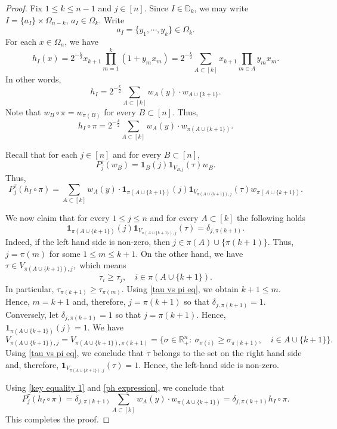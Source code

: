 \documentclass{amsart}
\numberwithin{equation}{section}
\theoremstyle{definition}
\theoremstyle{remark}
\newcommand{\1}{\mathbf 1}
\begin{document}
\begin{proof} 
	Fix  $1\leq k \leq n-1$ and $j\in [n]$. 
	Since $I\in\mathbb{D}_k$, we may write $I=\{a_I\}\times \Omega_{n-k}$, $a_I\in \Omega_k$.	
Write
$$a_I=\{y_1,\cdots,y_k\}\in\Omega_k.$$
For each $x\in \Omega_n$, we have
$$h_I(x)=2^{-\frac{k}{2}}x_{k+1}\prod_{m=1}^k(1+y_mx_m)=2^{-\frac{k}{2}}\sum_{A\subset[k]}x_{k+1}\prod_{m\in A}y_mx_m.$$
In other words,
$$h_I=2^{-\frac{k}{2}}\sum_{A\subset [k]}w_A(y)\cdot w_{A\cup\{k+1\}}.$$
Note that $w_B\circ\pi=w_{\pi(B)}$ for every $B\subset [n].$ Thus,
$$h_I\circ\pi=2^{-\frac{k}{2}}\sum_{A\subset[k]}w_A(y)\cdot w_{\pi(A\cup\{k+1\})}.$$

\noindent Recall that for each $j\in [n]$ and for every $B\subset  [n]$,
$$
P^{\tau}_j(w_B)=\1_B(j)\1_{V_{B,j}}(\tau)w_B.
$$
Thus,
\begin{equation}\label{ph expression}
P_j^{\tau}(h_I\circ\pi)=\sum_{A\subset[k]}w_A(y)\cdot \1_{\pi(A\cup\{k+1\})}(j) \1_{V_{\pi(A\cup\{k+1\}),j}}(\tau) w_{\pi(A\cup\{k+1\})}.
\end{equation}

We now claim that for every $1\leq j\leq n$ and for every $A\subset [k]$ the following holds
\begin{equation}\label{key equality 1}
\1_{\pi(A\cup\{k+1\})}(j) \1_{V_{\pi(A\cup\{k+1\}),j}}(\tau)=\delta_{j,\pi(k+1)}.
\end{equation}
Indeed, if the left hand side is non-zero, then $j\in\pi(A)\cup\{\pi(k+1)\}.$ Thus, $j=\pi(m)$ for some $1\leq m\leq k+1.$ On the other hand, we have $\tau\in V_{\pi(A\cup\{k+1\}),j},$ which means
$$\tau_i\geq \tau_j,\quad i\in \pi(A\cup\{k+1\}).$$
In particular, $\tau_{\pi(k+1)}\geq\tau_{\pi(m)}.$ Using \eqref{tau vs pi eq}, we obtain $k+1\leq m.$ Hence, $m=k+1$ and, therefore, $j=\pi(k+1)$ so that $\delta_{j,\pi(k+1)}=1.$ 
Conversely, let $\delta_{j,\pi(k+1)}=1$ so that $j=\pi(k+1).$ Hence, $\1_{\pi(A\cup\{k+1\})}(j)=1.$ We have
$$V_{\pi(A\cup\{k+1\}),j}=V_{\pi(A\cup\{k+1\}),\pi(k+1)}=\{\sigma\in\mathbb{R}^n_+:\ \sigma_{\pi(i)}\geq\sigma_{\pi(k+1)},\quad i\in A\cup\{k+1\}\}.$$
Using \eqref{tau vs pi eq}, we conclude that $\tau$ belongs to the set on the right hand side and, therefore, 
$\1_{V_{\pi(A\cup\{k+1\}),j}}(\tau)=1.$ Hence, the left-hand side is non-zero. 

Using \eqref{key equality 1} and \eqref{ph expression}, we conclude that
$$P_j^{\tau}(h_I\circ\pi)=\delta_{j,\pi(k+1)}\sum_{A\subset [k]}w_A(y)\cdot w_{\pi(A\cup\{k+1\})}=\delta_{j,\pi(k+1)}h_I\circ\pi.$$
This completes the proof.
\end{proof}
\end{document}
